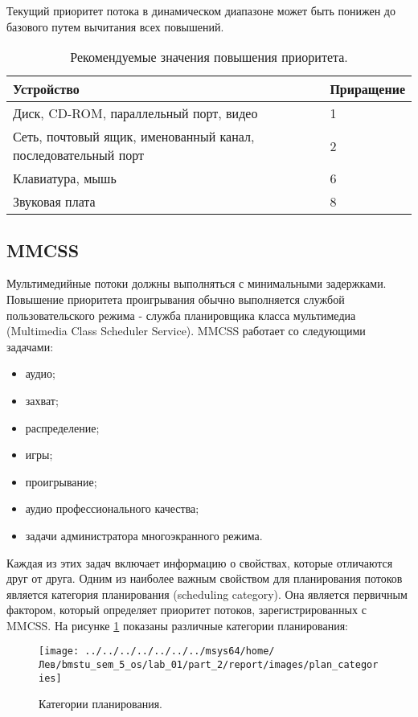 Текущий приоритет потока в динамическом диапазоне может быть понижен до базового путем вычитания всех повышений.

\begin{table}[ht!]
	\captionsetup{singlelinecheck = false, justification=raggedright}
	\caption{Рекомендуемые значения повышения приоритета.}
	\begin{center}
		\begin{tabular}{|p{100mm}|l|}
			\hline
			\textbf{Устройство} & \textbf{Приращение} \\
			\hline
			Диск, CD-ROM, параллельный порт, видео & 1 \\
			\hline
			Сеть, почтовый ящик, именованный канал, последовательный порт & 2 \\
			\hline
			Клавиатура, мышь & 6 \\
			\hline
			Звуковая плата & 8 \\
			\hline
		\end{tabular}
	\end{center}
	\label{tab:io}
\end{table}

\subsection{MMCSS}
Мультимедийные потоки должны выполняться с минимальными задержками. Повышение приоритета проигрывания обычно выполняется службой пользовательского режима - служба планировщика класса мультимедиа (Multimedia Class Scheduler Service). MMCSS работает со следующими задачами:
\begin{itemize}
	\item аудио;
	\item захват;
	\item распределение;
	\item игры;
	\item проигрывание;
	\item аудио профессионального качества;
	\item задачи администратора многоэкранного режима.	
\end{itemize}

Каждая из этих задач включает информацию о свойствах, которые отличаются друг от друга. Одним из наиболее важным свойством для планирования потоков является категория планирования (scheduling category). Она является первичным фактором, который определяет приоритет потоков, зарегистрированных с MMCSS. На рисунке \ref{png:category_plans} показаны различные категории планирования:
\begin{figure}[H]
	\centering
	{
		\texttt{[image: ../../../../../../../msys64/home/Лев/bmstu\_sem\_5\_os/lab\_01/part\_2/report/images/plan\_categories]}
		\caption{Категории планирования.}
		\label{png:category_plans}
	}
\end{figure}

